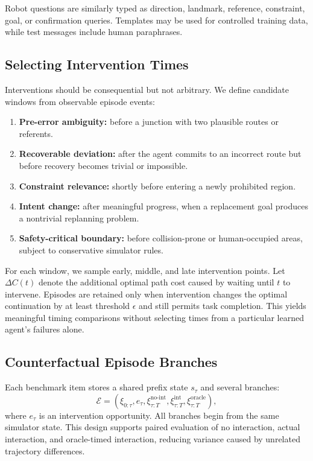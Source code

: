 \documentclass[10pt]{article}
\begin{document}
Robot questions are similarly typed as direction, landmark, reference,
constraint, goal, or confirmation queries. Templates may be used for controlled
training data, while test messages include human paraphrases.

\subsection{Selecting Intervention Times}
\label{sec:timing}

Interventions should be consequential but not arbitrary. We define candidate
windows from observable episode events:
\begin{enumerate}[leftmargin=1.6em]
  \item \textbf{Pre-error ambiguity:} before a junction with two plausible
  routes or referents.
  \item \textbf{Recoverable deviation:} after the agent commits to an
  incorrect route but before recovery becomes trivial or impossible.
  \item \textbf{Constraint relevance:} shortly before entering a newly
  prohibited region.
  \item \textbf{Intent change:} after meaningful progress, when a replacement
  goal produces a nontrivial replanning problem.
  \item \textbf{Safety-critical boundary:} before collision-prone or
  human-occupied areas, subject to conservative simulator rules.
\end{enumerate}

For each window, we sample early, middle, and late intervention points. Let
$\Delta C(t)$ denote the additional optimal path cost caused by waiting until
$t$ to intervene. Episodes are retained only when intervention changes the
optimal continuation by at least threshold $\epsilon$ and still permits task
completion. This yields meaningful timing comparisons without selecting times
from a particular learned agent's failures alone.

\subsection{Counterfactual Episode Branches}

Each benchmark item stores a shared prefix state $s_\tau$ and several branches:
\begin{equation}
  \mathcal{E}=
  \left(\xi_{0:\tau},e_\tau,
  \xi_{\tau:T}^{\mathrm{no\text{-}int}},
  \xi_{\tau:T}^{\mathrm{int}},
  \xi_{\tau:T}^{\mathrm{oracle}}\right),
\end{equation}
where $e_\tau$ is an intervention opportunity. All branches begin from the
same simulator state. This design supports paired evaluation of no
interaction, actual interaction, and oracle-timed interaction, reducing
variance caused by unrelated trajectory differences.
\end{document}
